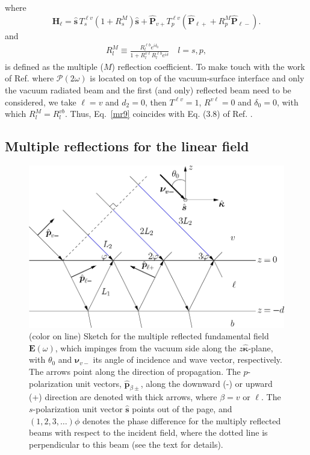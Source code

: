 where
\begin{equation}\label{mr9}
\mathbf{H}_{\ell}
= \hat{\mathbf{s}}\,T_s^{\ell v}
\left(1+
R^M_s
\right)
\hat{\mathbf{s}}
+ \hat{\mathbf{P}}_{v+}T_{p}^{\ell v}
\left(
\hat{\mathbf{P}}_{\ell +} +
R^M_p
 \hat{\mathbf{P}}_{\ell -}
\right). 
\end{equation}
and
\begin{align}\label{m61}
R^M_l\equiv\frac{R^{\ell b}_le^{i\delta_{0}}}{1+R^{v\ell}_l R^{\ell b}_l e^{i\delta}}
\quad l=s,p
,
\end{align}
is defined as the multiple ($M$) reflection coefficient.
To make touch with the work of Ref. \cite{mizrahiJOSA88} where
$\boldsymbol{\mathcal{P}}(2\omega)$ is located on top of the
vacuum-surface interface and only the vacuum radiated beam and the
first (and only) reflected beam need to be considered, we take
$\ell=v$ and $d_2=0$, then 
$T^{\ell v}=1$, $R^{v\ell}=0$ and $\delta_{0}=0$, with which
$R^M_l=R^{vb}_l$. 
Thus, Eq.~\eqref{mr9} coincides with Eq. (3.8) of
Ref. \cite{mizrahiJOSA88}. 

\subsection{Multiple reflections for the linear field}
\begin{figure}[t]
\centering 
\includegraphics[scale=.5]{figures/02-shgyield/linear-field}
\caption{(color on line) Sketch for the multiple reflected  fundamental field
$\mathbf{E}(\omega)$, which impinges from the vacuum side along the
$z\hat{\boldsymbol{\kappa}}$-plane, with $\theta_{0}$ and $\boldsymbol{\nu}_{v-}$
its angle of incidence and wave vector, respectively. The arrows point along the
direction of propagation. The $p$-polarization unit vectors, $\hat{\mathbf{p}}_{\beta
\pm}$, along the downward (-) or upward (+) direction are denoted with thick
arrows, where $\beta=v$ or $\ell$. The $s$-polarization unit vector $\hat{\mathbf{s}}$
points out of the page, and $(1,2,3,\dots)\phi$ denotes the phase difference for
the multiply reflected beams with respect to the incident field, where the
dotted line is perpendicular to this beam (see the text for
details).\label{linear}}
\end{figure}

